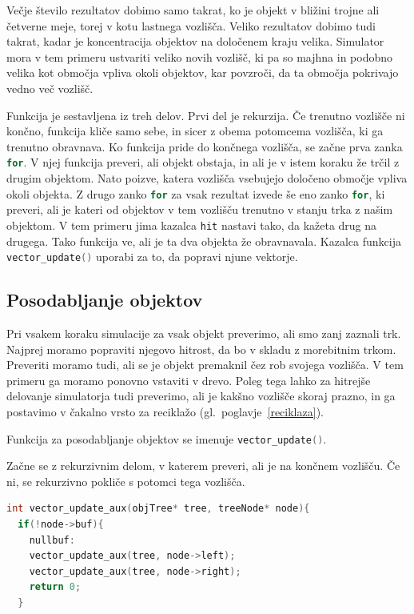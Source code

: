 \documentclass[a4paper,12pt]{article}
\begin{document}
Večje število rezultatov dobimo samo takrat, ko je objekt v bližini trojne ali četverne meje,
torej v kotu lastnega vozlišča. Veliko rezultatov dobimo tudi takrat, kadar je koncentracija 
objektov na določenem kraju velika. Simulator mora v tem primeru ustvariti veliko novih vozlišč, ki pa so 
majhna in podobno velika kot območja vpliva okoli objektov, kar povzroči, da ta območja pokrivajo vedno več vozlišč.

Funkcija je sestavljena iz treh delov. Prvi del je rekurzija. Če trenutno vozlišče ni končno, funkcija kliče samo sebe, in sicer 
z obema potomcema vozlišča, ki ga trenutno obravnava. Ko funkcija pride do končnega vozlišča, se začne
prva zanka \lstinline[language=C]{for}. V njej funkcija preveri, ali objekt obstaja, in ali je v istem koraku
že trčil z drugim objektom. Nato poizve, katera vozlišča vsebujejo določeno območje vpliva okoli objekta.
Z drugo zanko \lstinline[language=C]{for} za vsak rezultat izvede še eno zanko \lstinline[language=C]{for},
ki preveri, ali je kateri od objektov v tem vozlišču trenutno v stanju trka z našim objektom. V tem primeru
jima kazalca \lstinline[language=C]{hit} nastavi tako, da kažeta drug na drugega. Tako funkcija ve,
ali je ta dva objekta že obravnavala. Kazalca funkcija \lstinline[language=C]{vector_update()} uporabi za to, da
popravi njune vektorje. 
\subsection{Posodabljanje objektov}
Pri vsakem koraku simulacije za vsak objekt preverimo, ali smo zanj zaznali trk.
Najprej moramo popraviti njegovo hitrost, da bo v skladu z morebitnim trkom. Preveriti moramo tudi,
ali se je objekt premaknil čez rob svojega vozlišča. V tem primeru ga moramo ponovno vstaviti v drevo.
Poleg tega lahko za hitrejše delovanje simulatorja tudi preverimo, ali je kakšno vozlišče skoraj prazno, in ga postavimo
v čakalno vrsto za reciklažo (gl.\ poglavje~\ref{reciklaza}).

Funkcija za posodabljanje objektov se imenuje \lstinline[language=C]{vector_update()}.

Začne se z rekurzivnim delom, v katerem preveri, ali je na končnem vozlišču. Če ni, se rekurzivno pokliče
s potomci tega vozlišča.

\begin{lstlisting}[caption={\lstinline|vector_update()| -- Rekurzivni del}, label=vectorupdate1, language=C]
int vector_update_aux(objTree* tree, treeNode* node){
  if(!node->buf){
    nullbuf:
    vector_update_aux(tree, node->left);
    vector_update_aux(tree, node->right);
    return 0;
  }
\end{lstlisting}
\end{document}
